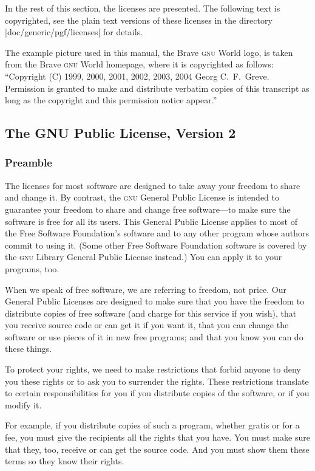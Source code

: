 In the rest of this section, the licenses are presented. The following text is
copyrighted, see the plain text versions of these licenses in the directory
|doc/generic/pgf/licenses| for details.

The example picture used in this manual, the Brave \textsc{gnu} World logo, is
taken from the Brave \textsc{gnu} World homepage, where it is copyrighted as
follows: ``Copyright (C) 1999, 2000, 2001, 2002, 2003, 2004 Georg C.~F.\ Greve.
Permission is granted to make and distribute verbatim copies of this transcript
as long as the copyright and this permission notice appear.''


\subsection{The GNU Public License, Version 2}

\subsubsection{Preamble}

The licenses for most software are designed to take away your freedom to  share
and change it.  By contrast, the \textsc{gnu} General Public License is
intended to guarantee your freedom to share and change free software---to make
sure the software is free for all its users.  This General Public License
applies to most of the Free Software Foundation's software and to any other
program whose authors commit to using it.  (Some other Free Software Foundation
software is covered by the \textsc{gnu} Library General Public License
instead.)  You can apply it to your programs, too.

When we speak of free software, we are referring to freedom, not price. Our
General Public Licenses are designed to make sure that you have the freedom to
distribute copies of free software (and charge for this service if you wish),
that you receive source code or can get it if you want it, that you can change
the software or use pieces of it in new free programs; and that you know you
can do these things.

To protect your rights, we need to make restrictions that forbid anyone to deny
you these rights or to ask you to surrender the rights.  These restrictions
translate to certain responsibilities for you if you distribute copies of the
software, or if you modify it.

For example, if you distribute copies of such a program, whether gratis or for
a fee, you must give the recipients all the rights that you have.  You must
make sure that they, too, receive or can get the source code.  And you must
show them these terms so they know their rights.

